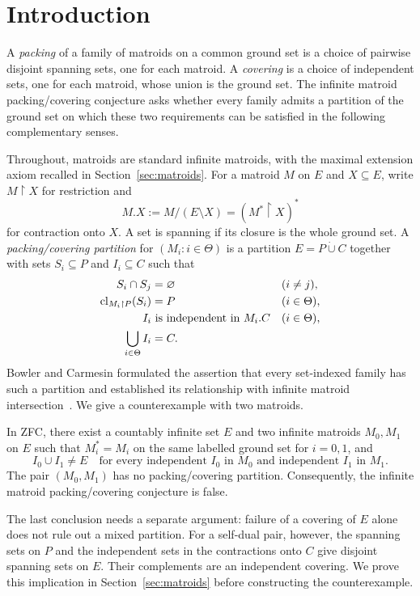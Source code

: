 \section{Introduction}\label{sec:introduction}

A \emph{packing} of a family of matroids on a common ground set is a choice
of pairwise disjoint spanning sets, one for each matroid. A \emph{covering}
is a choice of independent sets, one for each matroid, whose union is the
ground set. The infinite matroid packing/covering conjecture asks whether
every family admits a partition of the ground set on which these two
requirements can be satisfied in the following complementary senses.

Throughout, matroids are standard infinite matroids, with the maximal
extension axiom recalled in Section~\ref{sec:matroids}. For a matroid $M$
on $E$ and $X\subseteq E$, write $M\!\upharpoonright X$ for restriction
and
\[
 M.X:=M/(E\setminus X)=(M^*\!\upharpoonright X)^*
\]
for contraction onto $X$. A set is spanning if its closure is the whole
ground set. A \emph{packing/covering partition} for $(M_i:i\in\Theta)$ is
a partition $E=P\dot\cup C$ together with sets $S_i\subseteq P$ and
$I_i\subseteq C$ such that
\begin{align*}
 S_i\cap S_j&=\varnothing &&(i\ne j),\\
 \operatorname{cl}_{M_i\upharpoonright P}(S_i)&=P &&(i\in\Theta),\\
 I_i&\text{ is independent in }M_i.C &&(i\in\Theta),\\
 \bigcup_{i\in\Theta}I_i&=C.
\end{align*}
Bowler and Carmesin formulated the assertion that every set-indexed family
has such a partition and established its relationship with infinite
matroid intersection~\cite[Conjecture~1.3 and Corollary~3.9]{BowlerCarmesin2015}. We give a counterexample
with two matroids.

\begin{theorem}\label{thm:main}
In ZFC, there exist a countably infinite set $E$ and two infinite matroids
$M_0,M_1$ on $E$ such that $M_i^*=M_i$ on the same labelled ground set for
$i=0,1$, and
\[
 I_0\cup I_1\ne E
 \quad\text{for every independent }I_0\text{ in }M_0
 \text{ and independent }I_1\text{ in }M_1.
\]
The pair $(M_0,M_1)$ has no packing/covering partition. Consequently, the
infinite matroid packing/covering conjecture is false.
\end{theorem}

The last conclusion needs a separate argument: failure of a covering of
$E$ alone does not rule out a mixed partition. For a self-dual pair,
however, the spanning sets on $P$ and the independent sets in the
contractions onto $C$ give disjoint spanning sets on $E$. Their complements
are an independent covering. We prove this implication in
Section~\ref{sec:matroids} before constructing the counterexample.

